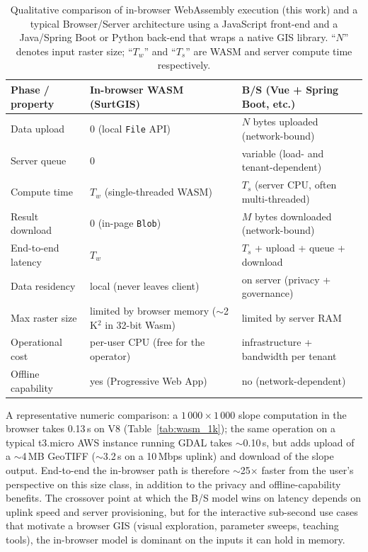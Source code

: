\documentclass[preprint,review,12pt,authoryear]{elsarticle}
\begin{document}
\begin{table}[htbp]
\centering
\caption{Qualitative comparison of in-browser WebAssembly execution (this work) and a typical Browser/Server architecture using a JavaScript front-end and a Java/Spring Boot or Python back-end that wraps a native GIS library. ``$N$'' denotes input raster size; ``$T_w$'' and ``$T_s$'' are WASM and server compute time respectively.}
\label{tab:wasm_vs_bs}
\begin{tabular}{@{}l p{4.7cm} p{5.0cm}@{}}
\toprule
Phase / property & In-browser WASM (SurtGIS)         & B/S (Vue + Spring Boot, etc.) \\
\midrule
Data upload        & 0 (local \texttt{File} API)                & $N$ bytes uploaded (network-bound) \\
Server queue       & 0                                          & variable (load- and tenant-dependent) \\
Compute time       & $T_w$ (single-threaded WASM)               & $T_s$ (server CPU, often multi-threaded) \\
Result download    & 0 (in-page \texttt{Blob})                  & $M$ bytes downloaded (network-bound) \\
End-to-end latency & $T_w$                                      & $T_s$ + upload + queue + download \\
Data residency     & local (never leaves client)                & on server (privacy + governance) \\
Max raster size    & limited by browser memory ($\sim$2\,K$^{2}$ in 32-bit Wasm) & limited by server RAM \\
Operational cost   & per-user CPU (free for the operator)       & infrastructure + bandwidth per tenant \\
Offline capability & yes (Progressive Web App)                  & no (network-dependent) \\
\bottomrule
\end{tabular}
\end{table}

A representative numeric comparison: a $1\,000 \times 1\,000$ slope computation in the browser takes 0.13\,s on V8 (Table~\ref{tab:wasm_1k}); the same operation on a typical t3.micro AWS instance running GDAL takes $\sim$0.10\,s, but adds upload of a $\sim$4\,MB GeoTIFF ($\sim$3.2\,s on a 10\,Mbps uplink) and download of the slope output. End-to-end the in-browser path is therefore $\sim$25$\times$ faster from the user's perspective on this size class, in addition to the privacy and offline-capability benefits. The crossover point at which the B/S model wins on latency depends on uplink speed and server provisioning, but for the interactive sub-second use cases that motivate a browser GIS (visual exploration, parameter sweeps, teaching tools), the in-browser model is dominant on the inputs it can hold in memory.
\end{document}
